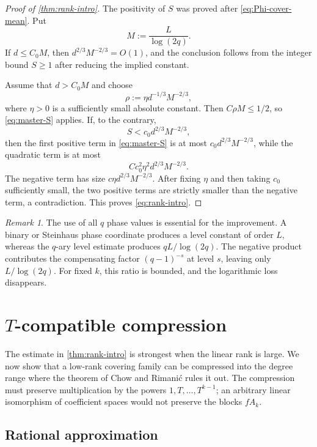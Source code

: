\documentclass[11pt,reqno]{amsart}
\numberwithin{equation}{section}
\theoremstyle{definition}
\theoremstyle{remark}
\newtheorem{remark}[remark]{Remark}
\begin{document}
\begin{proof}[Proof of \cref{thm:rank-intro}]
The positivity of $S$ was proved after
\eqref{eq:Phi-cover-mean}.  Put
\[
 M:=\frac{L}{\log(2q)}.
\]
If $d\le C_0M$, then
$d^{2/3}M^{-2/3}=O(1)$, and the conclusion follows from the integer bound $S\ge1$ after reducing the implied constant.

Assume that $d>C_0M$ and choose
\begin{equation}\label{eq:rho-choice-rank}
 \rho:=\eta d^{-1/3}M^{-2/3},
\end{equation}
where $\eta>0$ is a sufficiently small absolute constant.  Then
$C\rho M\le1/2$, so \eqref{eq:master-S} applies.  If, to the contrary,
\[
 S<c_0d^{2/3}M^{-2/3},
\]
then the first positive term in \eqref{eq:master-S} is at most
$c_0d^{2/3}M^{-2/3}$, while the quadratic term is at most
\[
 Cc_0^2\eta^2d^{2/3}M^{-2/3}.
\]
The negative term has size
$c\eta d^{2/3}M^{-2/3}$.  After fixing $\eta$ and then taking $c_0$ sufficiently small, the two positive terms are strictly smaller than the negative term, a contradiction.  This proves \eqref{eq:rank-intro}.
\end{proof}

\begin{remark}
The use of all $q$ phase values is essential for the improvement.  A binary or Steinhaus phase coordinate produces a level constant of order $L$, whereas the $q$-ary level estimate produces $qL/\log(2q)$.  The negative product contributes the compensating factor $(q-1)^{-s}$ at level $s$, leaving only $L/\log(2q)$.  For fixed $k$, this ratio is bounded, and the logarithmic loss disappears.
\end{remark}


\section{\texorpdfstring{$T$}{T}-compatible compression}\label{sec:compression}

The estimate in \cref{thm:rank-intro} is strongest when the linear rank is large.  We now show that a low-rank covering family can be compressed into the degree range where the theorem of Chow and Rimani\'c rules it out.  The compression must preserve multiplication by the powers
$1,T,\ldots,T^{k-1}$; an arbitrary linear isomorphism of coefficient spaces would not preserve the blocks $fA_k$.

\subsection{Rational approximation}
\end{document}
